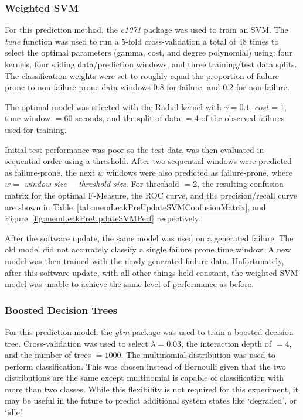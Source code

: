 \subsubsection{Weighted \ac{SVM}}
For this prediction method, the \emph{e1071} package was used to train an
\ac{SVM}.  The \emph{tune} function was used to run a $5$-fold cross-validation
a total of $48$ times to select the optimal parameters (gamma, cost, and degree
polynomial) using: four kernels, four sliding data/prediction windows, and
three training/test data splits.  The classification weights were set to
roughly equal the proportion of failure prone to non-failure prone data windows
$0.8$ for failure, and $0.2$ for non-failure.

The optimal model was selected with the Radial kernel with $\gamma = 0.1$,
$cost = 1$, time window $= 60$ seconds, and the split of data $= 4$ of the
observed failures used for training.

Initial test performance was poor so the test data was then evaluated in
sequential order using a threshold.  After two sequential windows were
predicted as failure-prone, the next $w$ windows were also predicted as
failure-prone, where $w = $ \emph{window size} $-$ \emph{threshold size}.  For
threshold $= 2$, the resulting confusion matrix for the optimal F-Measure, the
\ac{ROC} curve, and the precision/recall curve are shown in
Table~\ref{tab:memLeakPreUpdateSVMConfusionMatrix}, and
Figure~\ref{fig:memLeakPreUpdateSVMPerf} respectively.

\figMemLeakPreUpdateSVMPerf
\tabMemLeakPreUpdateSVMConfusionMatrix

After the software update, the same model was used on a generated failure.  The
old model did not accurately classify a single failure prone time window.  A
new model was then trained with the newly generated failure data.
Unfortunately, after this software update, with all other things held constant,
the weighted SVM model was unable to achieve the same level of performance as
before.

\subsubsection{Boosted Decision Trees}
For this prediction model, the \emph{gbm} package was used to train a boosted
decision tree.  Cross-validation was used to select $\lambda = 0.03$, the
interaction depth of $= 4$, and the number of trees $= 1000$.  The multinomial
distribution was used to perform classification.  This was chosen instead of
Bernoulli given that the two distributions are the same except multinomial is
capable of classification with more than two classes.  While this flexibility
is not required for this experiment, it may be useful in the future to predict
additional system states like `degraded', or `idle'.

